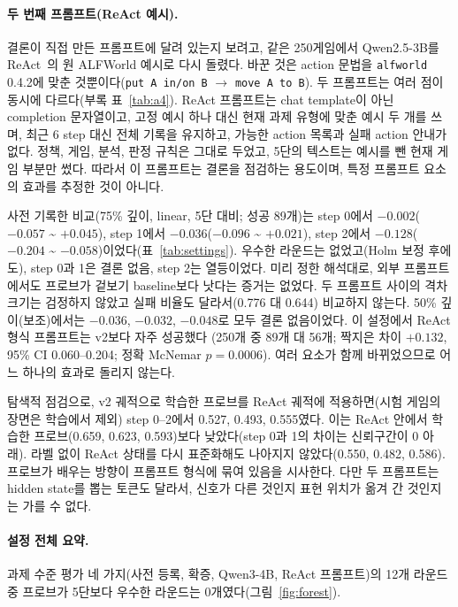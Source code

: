 \documentclass[11pt]{article}
\newcommand{\code}[1]{\texttt{#1}}
\begin{document}
\paragraph{두 번째 프롬프트(ReAct 예시).} 결론이 직접 만든 프롬프트에 달려 있는지 보려고, 같은 250게임에서 Qwen2.5-3B를 ReAct~\cite{yao2023react}의 원 ALFWorld 예시로 다시 돌렸다.
바꾼 것은 action 문법을 \code{alfworld} 0.4.2에 맞춘 것뿐이다(\code{put A in/on B} $\rightarrow$ \code{move A to B}). 두 프롬프트는 여러 점이 동시에 다르다(부록 표~\ref{tab:a4}).
ReAct 프롬프트는 chat template이 아닌 completion 문자열이고, 고정 예시 하나 대신 현재 과제 유형에 맞춘 예시 두 개를 쓰며,
최근 6 step 대신 전체 기록을 유지하고, 가능한 action 목록과 실패 action 안내가 없다. 정책, 게임, 분석, 판정 규칙은 그대로 두었고,
5단의 텍스트는 예시를 뺀 현재 게임 부분만 썼다. 따라서 이 프롬프트는 결론을 점검하는 용도이며, 특정 프롬프트 요소의 효과를 추정한 것이 아니다.

사전 기록한 비교(75\% 깊이, linear, 5단 대비; 성공 89개)는 step 0에서 $-0.002$($-0.057$ \textasciitilde{} $+0.045$), step 1에서 $-0.036$($-0.096$ \textasciitilde{} $+0.021$), step 2에서 $-0.128$($-0.204$ \textasciitilde{} $-0.058$)이었다(표~\ref{tab:settings}).
우수한 라운드는 없었고(Holm 보정 후에도), step 0과 1은 결론 없음, step 2는 열등이었다. 미리 정한 해석대로, 외부 프롬프트에서도 프로브가 겉보기 baseline보다 낫다는 증거는 없었다.
두 프롬프트 사이의 격차 크기는 검정하지 않았고 실패 비율도 달라서(0.776 대 0.644) 비교하지 않는다.
50\% 깊이(보조)에서는 $-0.036$, $-0.032$, $-0.048$로 모두 결론 없음이었다. 이 설정에서 ReAct 형식 프롬프트는 v2보다 자주 성공했다
(250개 중 89개 대 56개; 짝지은 차이 $+0.132$, 95\% CI 0.060--0.204; 정확 McNemar $p = 0.0006$). 여러 요소가 함께 바뀌었으므로 어느 하나의 효과로 돌리지 않는다.

탐색적 점검으로, v2 궤적으로 학습한 프로브를 ReAct 궤적에 적용하면(시험 게임의 장면은 학습에서 제외) step 0--2에서 0.527, 0.493, 0.555였다.
이는 ReAct 안에서 학습한 프로브(0.659, 0.623, 0.593)보다 낮았다(step 0과 1의 차이는 신뢰구간이 0 아래). 라벨 없이 ReAct 상태를 다시 표준화해도 나아지지 않았다(0.550, 0.482, 0.586).
프로브가 배우는 방향이 프롬프트 형식에 묶여 있음을 시사한다. 다만 두 프롬프트는 hidden state를 뽑는 토큰도 달라서, 신호가 다른 것인지 표현 위치가 옮겨 간 것인지는 가를 수 없다.

\paragraph{설정 전체 요약.} 과제 수준 평가 네 가지(사전 등록, 확증, Qwen3-4B, ReAct 프롬프트)의 12개 라운드 중 프로브가 5단보다 우수한 라운드는 0개였다(그림~\ref{fig:forest}).
\end{document}
